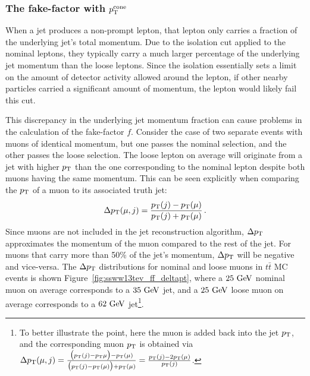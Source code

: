 %
\subsubsection{The fake-factor with $p_{\mathrm{T}}^{\textrm{cone}}$}\label{ssww13tev:ff_method_ptcone}
When a jet produces a non-prompt lepton, that lepton only carries a fraction of the underlying jet's total momentum.
Due to the isolation cut applied to the nominal leptons, they typically carry a much larger percentage of the underlying jet momentum than the loose leptons. %
Since the isolation essentially sets a limit on the amount of detector activity allowed around the lepton, if other nearby particles carried a significant amount of momentum, the lepton would likely fail this cut.

This discrepancy in the underlying jet momentum fraction can cause problems in the calculation of the fake-factor $f$.
Consider the case of two separate events with muons of identical momentum, but one passes the nominal selection, and the other passes the loose selection.
The loose lepton on average will originate from a jet with higher $p_{\mathrm{T}}$ than the one corresponding to the nominal lepton despite both muons having the same momentum.
This can be seen explicitly when comparing the $p_{\mathrm{T}}$ of a muon to its associated truth jet:
\begin{equation}
\Delta\pt(\mu,j) = \frac{\pt(j)-\pt(\mu)}{\pt(j)+\pt(\mu)}\,.
\label{eq:ssww13tev_ff_deltapt}
\end{equation}
Since muons are not included in the jet reconstruction algorithm, $\Delta p_{\mathrm{T}}$ approximates the momentum of the muon compared to the rest of the jet.
For muons that carry more than 50\% of the jet's momentum, $\Delta p_{\mathrm{T}}$ will be negative and vice-versa.
The $\Delta p_{\mathrm{T}}$ distributions for nominal and loose muons in $t\bar{t}$ MC events is shown Figure~\ref{fig:ssww13tev_ff_deltapt}, where a $25\gev$ nominal muon on average corresponds to a $35\gev$ jet, and a $25\gev$ loose muon on average corresponds to a $62\gev$ jet\footnote{To better illustrate the point, here the muon is added back into the jet $p_{\mathrm{T}}$, and the corresponding muon $p_{\mathrm{T}}$ is obtained via $\Delta p_{\mathrm{T}}(\mu,j) = \frac{\big(p_{\mathrm{T}}(j)-p_{\mathrm{T}}{\mu}\big)-p_{\mathrm{T}}(\mu)}{\big(p_{\mathrm{T}}(j)-p_{\mathrm{T}}(\mu)\big)+p_{\mathrm{T}}(\mu)} = \frac{p_{\mathrm{T}}(j)-2p_{\mathrm{T}}(\mu)}{p_{\mathrm{T}}(j)}$.}.

